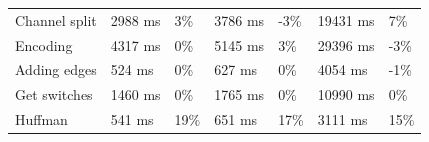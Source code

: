 \begin{table}[H]
\begin{tabular}{@{}lllllll@{}}
		Channel split           & 2988 ms                                                                                   & 3\%                                                                            & 3786 ms                                                                                    & -3\%                                                                          & 19431 ms                                                                                & 7\%                                                                           \\
		Encoding                & 4317 ms                                                                                   & 0\%                                                                            & 5145 ms                                                                                    & 3\%                                                                           & 29396 ms 																				& -3\%                                                                          \\
		Adding edges            & 524 ms                                                                                    & 0\%                                                                            & 627 ms                                                                                     & 0\%                                                                           & 4054 ms                                                                                 & -1\%                                                                          \\
		Get switches            & 1460 ms                                                                                   & 0\%                                                                            & 1765 ms                                                                                    & 0\%                                                                           & 10990 ms                                                                                & 0\%                                                                           \\
		Huffman                 & 541 ms                                                                                    & 19\%                                                                           & 651 ms                                                                                     & 17\%                                                                          & 3111 ms                                                                                 & 15\%                                                                          \\ \midrule

\end{tabular}
\end{table}
